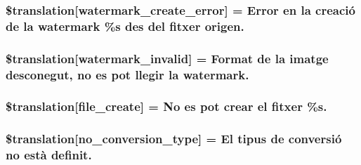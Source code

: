 \subsubsection[{\$translation}]{\setlength{\rightskip}{0pt plus 5cm}\$translation\mbox{[}\textquotesingle{}watermark\+\_\+create\+\_\+error\textquotesingle{}\mbox{]} = \textquotesingle{}Error en la creació de la watermark \%s des del fitxer origen.\textquotesingle{}}\label{class_8upload_8ca___c_a_8php_aabca0b65dadbc6184415c16375f284ca}
\hypertarget{class_8upload_8ca___c_a_8php_ac336e7a5701e47ba4a05e9e498a3cc44}{}
\subsubsection[{\$translation}]{\setlength{\rightskip}{0pt plus 5cm}\$translation\mbox{[}\textquotesingle{}watermark\+\_\+invalid\textquotesingle{}\mbox{]} = \textquotesingle{}Format de la imatge desconegut, no es pot llegir la watermark.\textquotesingle{}}\label{class_8upload_8ca___c_a_8php_ac336e7a5701e47ba4a05e9e498a3cc44}
\hypertarget{class_8upload_8ca___c_a_8php_a1ecb4673e4fb69e06b3f20b65cecf30a}{}
\subsubsection[{\$translation}]{\setlength{\rightskip}{0pt plus 5cm}\$translation\mbox{[}\textquotesingle{}file\+\_\+create\textquotesingle{}\mbox{]} = \textquotesingle{}No es pot crear el fitxer \%s.\textquotesingle{}}\label{class_8upload_8ca___c_a_8php_a1ecb4673e4fb69e06b3f20b65cecf30a}
\hypertarget{class_8upload_8ca___c_a_8php_a4712d7ec28e9a7f17eb3338af2358363}{}
\subsubsection[{\$translation}]{\setlength{\rightskip}{0pt plus 5cm}\$translation\mbox{[}\textquotesingle{}no\+\_\+conversion\+\_\+type\textquotesingle{}\mbox{]} = \textquotesingle{}El tipus de conversió no està definit.\textquotesingle{}}\label{class_8upload_8ca___c_a_8php_a4712d7ec28e9a7f17eb3338af2358363}
\hypertarget{class_8upload_8ca___c_a_8php_a783c9358bcf54a054545b50098bc679b}{}

